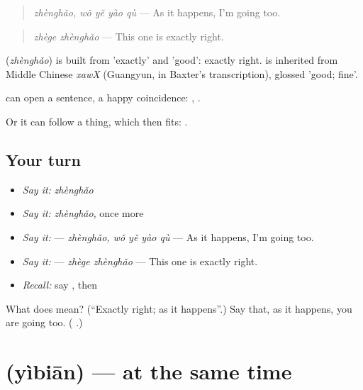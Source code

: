 \begin{quote}
\textbf{ } \emph{zhènghǎo, wǒ yě yào qù} — As it happens, I'm going too.
\end{quote}

\begin{quote}
\textbf{} \emph{zhège zhènghǎo} — This one is exactly right.
\end{quote}

\begin{cousinweb}
\textbf{} (\emph{zhènghǎo}) is built from  'exactly' and  'good': exactly right.  is inherited from Middle Chinese \emph{xawX} (Guangyun, in Baxter's transcription), glossed 'good; fine'.
\end{cousinweb}

\begin{grammarlens}[title={What you've built}]
 can open a sentence, a happy coincidence: , .

Or it can follow a thing, which then fits: .
\end{grammarlens}

\subsection*{Your turn}
\begin{itemize}
\raggedright
  \item \emph{Say it:} \emph{zhènghǎo}
  \item \emph{Say it:} \emph{zhènghǎo}, once more
  \item \emph{Say it:}   — \emph{zhènghǎo, wǒ yě yào qù} — As it happens, I'm going too.
  \item \emph{Say it:}  — \emph{zhège zhènghǎo} — This one is exactly right.
  \item \emph{Recall:} say , then 
\end{itemize}

\begin{tcolorbox}[breakable,colback=teal!4,colframe=teal!35!black,title={Before you move on}]
What does  mean? (\textquotedblleft{}Exactly right; as it happens\textquotedblright{}.) Say that, as it happens, you are going too. (\textbf{ }.)
\end{tcolorbox}
\section[\texorpdfstring{\zh{一边} (yìbiān)}{一边 (yìbiān)}]{ (yìbiān) — at the same time}


